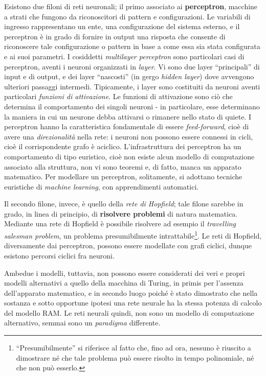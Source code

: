 \documentclass[10pt]{book}
\begin{document}
Esistono due filoni di reti neuronali; il primo associato ai
\textbf{perceptron}, macchine a strati che fungono da riconoscitori di pattern
e configurazioni. Le variabili di ingresso rappresentano un ente, una
configurazione del sistema esterno, e il perceptron è in grado di fornire in
output una risposta che consente di riconoscere tale configurazione o pattern
in base a come essa sia stata configurata e ai suoi parametri. I
cosiddetti \emph{multilayer perceptron} sono particolari casi di perceptron,
aventi i neuroni organizzati in \emph{layer}. Vi sono due layer ``principali''
di input e di output, e dei layer ``nascosti'' (in gergo \emph{hidden layer})
dove avvengono ulteriori passaggi intermedi. Tipicamente, i layer sono
costituiti da neuroni aventi particolari \emph{funzioni di attivazione}. Le
funzioni di attivazione sono ciò che determina il comportamento dei singoli
neuroni \-- in particolare, esse determinano la maniera in cui un neurone debba
attivarsi o rimanere nello stato di quiete. I perceptron hanno la
caratteristica fondamentale di essere \emph{feed-forward}, cioè di avere una
\emph{direzionalità} nella rete: i neuroni non possono essere connessi in
cicli, cioè il corrispondente grafo è aciclico. L'infrastruttura dei perceptron
ha un comportamento di tipo euristico, cioè non esiste alcun modello di
computazione associato alla struttura, non vi sono teoremi e, di fatto, manca
un apparato matematico. Per modellare un perceptron, solitamente, si adottano
tecniche euristiche di \emph{machine learning}, con apprendimenti automatici.

Il secondo filone, invece, è quello della \emph{rete di Hopfield}; tale filone
sarebbe in grado, in linea di principio, di \textbf{risolvere problemi} di
natura matematica. Mediante una rete di Hopfield è possibile risolvere ad
esempio il \emph{travelling salesman problem}, un problema presumibilmente
intrattabile\footnote{``Presumibilmente'' si riferisce al fatto che, fino ad
ora, nessuno è riuscito a dimostrare né che tale problema può essere risolto in
tempo polinomiale, né che non può esserlo.}. Le reti di Hopfield, diversamente
dai perceptron, possono essere modellate con grafi ciclici, dunque esistono
percorsi ciclici fra neuroni.

Ambedue i modelli, tuttavia, non possono essere considerati dei veri e propri
modelli alternativi a quello della macchina di Turing, in primis per l'assenza
dell'apparato matematico, e in secondo luogo poiché è stato dimostrato che
nella sostanza e sotto opportune ipotesi una rete neurale ha la stessa potenza
di calcolo del modello RAM. Le reti neurali quindi, non sono un modello di
computazione alternativo, semmai sono un \emph{paradigma} differente.
\end{document}
